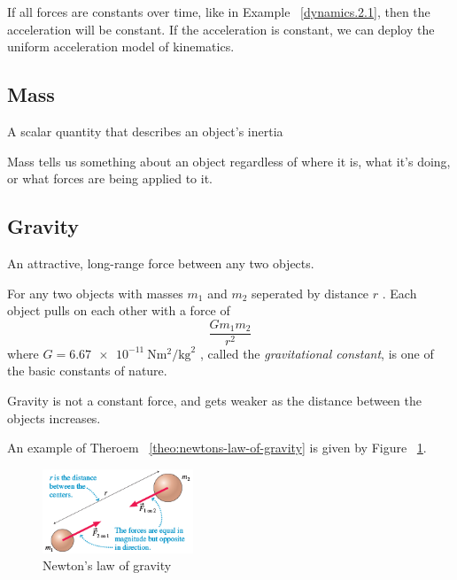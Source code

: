 If all forces are constants over time, like in Example~%
\ref{dynamics.2.1}, then the acceleration will be constant.  If the
acceleration is constant, we can deploy the uniform acceleration model
of kinematics.

\subsection{Mass}

\begin{definition}[Mass]
    A scalar quantity that describes an object's inertia
\end{definition}
Mass tells us something about an object regardless of where it is, what
it's doing, or what forces are being applied to it.

\subsection{Gravity}

\begin{definition}[Gravity]
    An attractive, long-range force between any two objects.
\end{definition}

\begin{theorem}
    \label{theo:newtons-law-of-gravity} For any two objects with masses
    $
        m_1
    $ and
    $
        m_2
    $ seperated by distance
    $
        r
    $%
.    Each object pulls on each other with a force of
    \begin{equation}
        \frac{Gm_1m_2}{r^2}
    \end{equation}
    where
    $
        G=\qty{6.67e-11}{\newton\square\metre\per\square\kilogram}
    $%
    , called the \emph{gravitational constant}, is one of the basic
    constants of nature.
    \begin{remark}
        Gravity is not a constant force, and gets weaker as the distance
        between the objects increases.
    \end{remark}
\end{theorem}

An example of Theroem~%
\ref{theo:newtons-law-of-gravity} is given by Figure~%
\ref{fig:newtons-law-of-gravity}.
\begin{figure}
    \centering
    \includegraphics[width=0.4\textwidth]{../figures/newtons-law-of-gravity.png}
    \caption{Newton's law of gravity}%
    \label{fig:newtons-law-of-gravity}
\end{figure}

